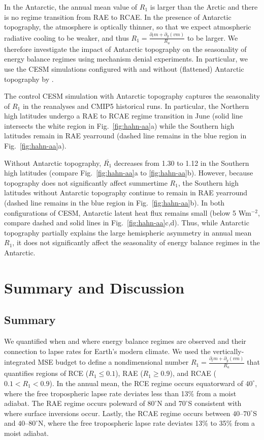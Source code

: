 \documentclass{ametsocV5}
\begin{document}
  In the Antarctic, the annual mean value of $R_1$ is larger than the Arctic and there is no regime transition from RAE to RCAE. In the presence of Antarctic topography, the atmosphere is optically thinner, so that we expect atmospheric radiative cooling to be weaker, and thus $R_1=\frac{\partial_t m + \partial_y (vm)}{R_a}$ to be larger. We therefore investigate the impact of Antarctic topography on the seasonality of energy balance regimes using mechanism denial experiments. In particular, we use the CESM simulations configured with and without (flattened) Antarctic topography by \cite{hahn2020}.

  The control CESM simulation with Antarctic topography captures the seasonality of $R_1$ in the reanalyses and CMIP5 historical runs. In particular, the Northern high latitudes undergo a RAE to RCAE regime transition in June (solid line intersects the white region in Fig.~\ref{fig:hahn-aa}a) while the Southern high latitudes remain in RAE yearround (dashed line remains in the blue region in Fig.~\ref{fig:hahn-aa}a).

  Without Antarctic topography, $\overline{R_1}$ decreases from 1.30 to 1.12 in the Southern high latitudes (compare Fig.~\ref{fig:hahn-aa}a to \ref{fig:hahn-aa}b). However, because topography does not significantly affect summertime $R_1$, the Southern high latitudes without Antarctic topography continue to remain in RAE yearround (dashed line remains in the blue region in Fig.~\ref{fig:hahn-aa}b). In both configurations of CESM, Antarctic latent heat flux remains small (below 5 Wm$^{-2}$, compare dashed and solid lines in Fig.~\ref{fig:hahn-aa}c,d). Thus, while Antarctic topography partially explains the large hemispheric asymmetry in annual mean $R_1$, it does not significantly affect the seasonality of energy balance regimes in the Antarctic.

\section{Summary and Discussion}\label{sec:conclusion}
\subsection{Summary}
We quantified when and where energy balance regimes are observed and their connection to lapse rates for Earth's modern climate. We used the vertically-integrated MSE budget to define a nondimensional number $R_1=\frac{\partial_t m + \partial_y (vm)}{R_a}$ that quantifies regions of RCE ($R_1\le0.1$), RAE ($R_1\ge0.9$), and RCAE ($0.1<R_1<0.9$). In the annual mean, the RCE regime occurs equatorward of $40^\circ$, where the free tropospheric lapse rate deviates less than 13\% from a moist adiabat. The RAE regime occurs poleward of $80^\circ$N and $70^\circ$S consistent with where surface inversions occur. Lastly, the RCAE regime occurs between $40$--$70^\circ$S and $40$--$80^\circ$N, where the free tropospheric lapse rate deviates 13\% to 35\% from a moist adiabat.
\end{document}
